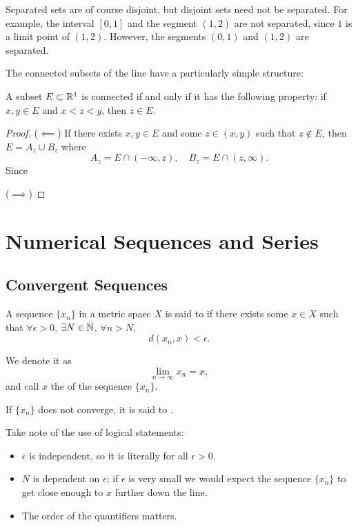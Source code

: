 \begin{remark}
Separated sets are of course disjoint, but disjoint sets need not be separated. For example, the interval $[0,1]$ and the segment $(1,2)$ are not separated, since $1$ is a limit point of $(1,2)$. However, the segments $(0,1)$ and $(1,2)$ are separated.
\end{remark}

The connected subsets of the line have a particularly simple structure: 

\begin{proposition}
A subset $E\subset\mathbb R^1$ is connected if and only if it has the following property: if $x,y\in E$ and $x<z<y$, then $z\in E$.
\end{proposition}

\begin{proof}
($\impliedby$) If there exists $x,y\in E$ and some $z\in(x,y)$ such that $z\notin E$, then $E=A_z\cup B_z$ where
\[ A_z=E\cap(-\infty,z), \quad B_z=E\cap(z,\infty). \]
Since 

($\implies$) 
\end{proof}

\chapter{Numerical Sequences and Series}
\section{Convergent Sequences}
\begin{definition}
A sequence $\{x_n\}$ in a metric spaec $X$ is said to  if there exists some $x\in X$ such that $\forall\epsilon>0$, $\exists N\in\mathbb N$, $\forall n>N$, 
\[ d(x_n,x)<\epsilon. \]

We denote it as 
\[ \lim_{n\to\infty}x_n=x, \]
and call $x$ the  of the sequence $\{x_n\}$.

If $\{x_n\}$ does not converge, it is said to .
\end{definition}

\begin{remark}
Take note of the use of logical statements:
\begin{itemize}
\item $\epsilon$ is independent, so it is literally for all $\epsilon>0$.
\item $N$ is dependent on $\epsilon$; if $\epsilon$ is very small we would expect the sequence $\{x_n\}$ to get close enough to $x$ further down the line.
\item The order of the quantifiers matters.
\end{itemize}
\end{remark}

